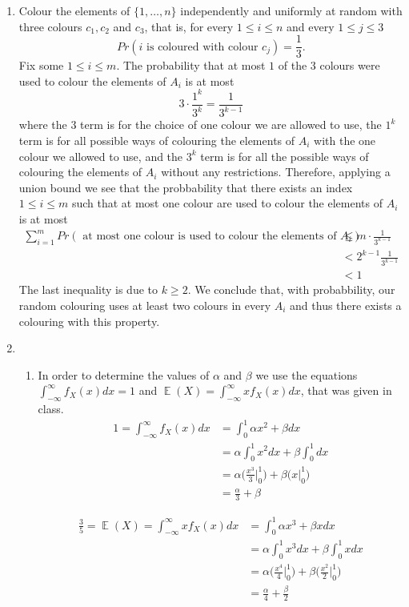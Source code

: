 \documentclass[a4paper, 11pt, oneside]{article}
\DeclareMathOperator{\EX}{\mathbb{E}}
\begin{document}
\begin{enumerate}
\item Colour the elements of $\{1,\ldots,n\}$ independently and uniformly at random with three colours $c_1,c_2$ and $c_3$, 
that is, for every $1 \leq i \leq n$ and every $1 \leq j \leq 3$
\begin{equation*}
Pr(i\text{ is coloured with colour }c_j) = \frac{1}{3}.
 \end{equation*}
Fix some $1 \leq i \leq m$. The probability that at most $1$ of the $3$ colours were used to colour the elements of $A_i$ is at most
\begin{equation*}
3 \cdot \frac{1^k}{3^k} = \frac{1}{3^{k-1}}
 \end{equation*}
 where the $3$ term is for the choice of one colour we are allowed to use, the $1^k$ term is for all possible ways of colouring the elements of $A_i$ with the one colour we allowed to use, and the $3^k$ term is for all the possible ways of colouring the elements of $A_i$ without any restrictions.
 Therefore, applying a union bound we see that the probbability that there exists an index $1 \leq i \leq m$ such that at most one colour are used to colour the elements of $A_i$ is at most
 \begin{align*}
\sum^m_{i=1}Pr(\text{ at most one colour is used to colour the elements of } A_i) &\leq m \cdot\frac{1}{3^{k-1}} 
\\&< 2^{k-1} \frac{1}{3^{k-1}}  \\&< 1
 \end{align*}
The last inequality is due to $k \geq 2$. We conclude that, with probabbility, our random colouring uses at least two colours in every $A_i$ and thus there exists a colouring with this property.
\item
 \begin{enumerate}
\item  
In order to determine the values of $\alpha$ and $\beta$ we use the equations
 $\int_{-\infty}^{\infty} f_X(x) dx = 1$ and $\EX(X) = \int_{-\infty}^{\infty} x f_X(x) dx$, that was given in class.
 \begin{align*}\label{ff}
1 = \int_{-\infty}^{\infty} f_X(x) dx &=
\int_{0}^{1} \alpha x^2 + \beta dx  \\&=
\alpha \int_{0}^{1}  x^2 dx +  \beta \int_{0}^{1}  dx  \\&=
\alpha \Big(\frac{x^3}{3}\Bigr|^1_0\Big) + \beta \Big(x\Bigr|^1_0\Big) \\&=
 \frac{\alpha}{3} + \beta
 \end{align*}
 
 \begin{align*}
\frac{3}{5} = \EX(X) =\int_{-\infty}^{\infty} x f_X(x) dx &=
\int_{0}^{1} \alpha x^3 + \beta x dx  \\&=
\alpha \int_{0}^{1}  x^3 dx +  \beta \int_{0}^{1}  x dx  \\&=
\alpha \Big(\frac{x^4}{4}\Bigr|^1_0\Big) + \beta \Big(\frac{x^2}{2}\Bigr|^1_0\Big) \\&=
 \frac{\alpha}{4} +  \frac{\beta}{2}
 \end{align*}
 

\end{enumerate}
\end{enumerate}
\end{document}

